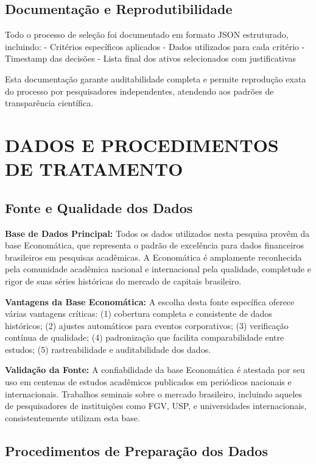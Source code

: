 \subsection{Documentação e Reprodutibilidade}

Todo o processo de seleção foi documentado em formato JSON estruturado, incluindo:
- Critérios específicos aplicados
- Dados utilizados para cada critério
- Timestamp das decisões
- Lista final dos ativos selecionados com justificativas

Esta documentação garante auditabilidade completa e permite reprodução exata do processo por pesquisadores independentes, atendendo aos padrões de transparência científica.

\section{DADOS E PROCEDIMENTOS DE TRATAMENTO}

\subsection{Fonte e Qualidade dos Dados}

\textbf{Base de Dados Principal:} Todos os dados utilizados nesta pesquisa provêm da base Economática, que representa o padrão de excelência para dados financeiros brasileiros em pesquisas acadêmicas. A Economática é amplamente reconhecida pela comunidade acadêmica nacional e internacional pela qualidade, completude e rigor de suas séries históricas do mercado de capitais brasileiro.

\textbf{Vantagens da Base Economática:} A escolha desta fonte específica oferece várias vantagens críticas: (1) cobertura completa e consistente de dados históricos; (2) ajustes automáticos para eventos corporativos; (3) verificação contínua de qualidade; (4) padronização que facilita comparabilidade entre estudos; (5) rastreabilidade e auditabilidade dos dados.

\textbf{Validação da Fonte:} A confiabilidade da base Economática é atestada por seu uso em centenas de estudos acadêmicos publicados em periódicos nacionais e internacionais. Trabalhos seminais sobre o mercado brasileiro, incluindo aqueles de pesquisadores de instituições como FGV, USP, e universidades internacionais, consistentemente utilizam esta base.

\subsection{Procedimentos de Preparação dos Dados}

